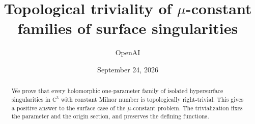 \documentclass[11pt]{article}
\title{Topological triviality of $\mu$-constant families of surface singularities}
\author{OpenAI}
\date{September 24, 2026}
\theoremstyle{definition}
\theoremstyle{remark}
\begin{document}
\maketitle
\begin{abstract}
We prove that every holomorphic one-parameter family of isolated hypersurface
singularities in $\mathbb C^3$ with constant Milnor number is topologically
right-trivial. This gives a positive answer to the surface case of the
$\mu$-constant problem. The trivialization fixes the parameter and the
origin section, and preserves the defining functions.
\end{abstract}
\tableofcontents














\appendix



{\raggedright}
\end{document}
